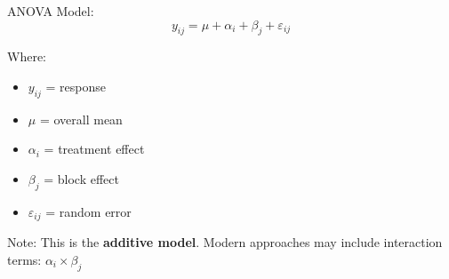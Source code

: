 \documentclass[aspectratio=43]{beamer}
\begin{document}
\begin{frame}
\begin{columns}
        \begin{column}{0.35\textwidth}
            \begin{block}{ANOVA Model:}
                \begin{equation*}
                    y_{ij} = \mu + \alpha_i + \beta_j + \varepsilon_{ij}
                \end{equation*}
                
                \small
                Where:
                \begin{itemize}
                    \item $y_{ij}$ = response
                    \item $\mu$ = overall mean
                    \item $\alpha_i$ = treatment effect
                    \item $\beta_j$ = block effect
                    \item $\varepsilon_{ij}$ = random error
                \end{itemize}
            \end{block}
            
            \begin{alertblock}{\tiny Note:}
                {\tiny This is the \textbf{additive model}. Modern approaches may include interaction terms: $\alpha_i \times \beta_j$}
            \end{alertblock}
        \end{column}
    \end{columns}
\end{frame}
\end{document}
